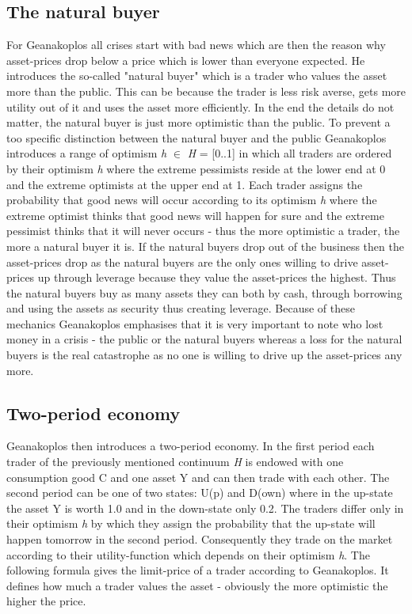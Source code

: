 \documentclass[../Bachelorarbeit.tex]{subfiles}
\begin{document}
\subsection{The natural buyer}
For Geanakoplos all crises start with bad news which are then the reason why asset-prices drop below a price which is lower than everyone expected. He introduces the so-called "natural buyer" which is a trader who values the asset more than the public. This can be because the trader is less risk averse, gets more utility out of it and uses the asset more efficiently. In the end the details do not matter, the natural buyer is just more optimistic than the public.
To prevent a too specific distinction between the natural buyer and the public Geanakoplos introduces a range of optimism \textit{h} $\in$ \textit{H} = [0..1] in which all traders are ordered by their optimism \textit{h} where the extreme pessimists reside at the lower end at 0 and the extreme optimists at the upper end at 1. Each trader assigns the probability that good news will occur according to its optimism \textit{h} where the extreme optimist thinks that good news will happen for sure and the extreme pessimist thinks that it will never occurs - thus the more optimistic a trader, the more a natural buyer it is. If the natural buyers drop out of the business then the asset-prices drop as the natural buyers are the only ones willing to drive asset-prices up through leverage because they value the asset-prices the highest. Thus the natural buyers buy as many assets they can both by cash, through borrowing and using the assets as security thus creating leverage. Because of these mechanics Geanakoplos emphasises that it is very important to note who lost money in a crisis - the public or the natural buyers whereas a loss for the natural buyers is the real catastrophe as no one is willing to drive up the asset-prices any more.

\subsection{Two-period economy}
Geanakoplos then introduces a two-period economy. In the first period each trader of the previously mentioned continuum \textit{H} is endowed with one consumption good C and one asset Y and can then trade with each other. The second period can be one of two states: U(p) and D(own) where in the up-state the asset Y is worth 1.0 and in the down-state only 0.2. The traders differ only in their optimism \textit{h} by which they assign the probability that the up-state will happen tomorrow in the second period. Consequently they trade on the market according to their utility-function which depends on their optimism \textit{h}. The following formula gives the limit-price of a trader according to Geanakoplos. It defines how much a trader values the asset - obviously the more optimistic the higher the price.
\end{document}
